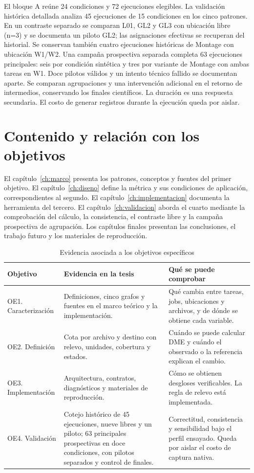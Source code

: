 El bloque A reúne 24 condiciones y 72 ejecuciones elegibles. La validación histórica detallada analiza 45 ejecuciones de 15 condiciones en los cinco patrones. En un contraste separado se comparan L01, GL2 y GL3 con ubicación libre (n=3) y se documenta un piloto GL2; las asignaciones efectivas se recuperan del historial. Se conservan también cuatro ejecuciones históricas de Montage con ubicación W1/W2. Una campaña prospectiva separada completa 63 ejecuciones principales: seis por condición sintética y tres por variante de Montage con ambas tareas en W1. Doce pilotos válidos y un intento técnico fallido se documentan aparte. Se comparan agrupaciones y una intervención adicional en el retorno de intermedios, conservando los finales científicos. La duración es una respuesta secundaria. El costo de generar registros durante la ejecución queda por aislar.

\section{Contenido y relación con los objetivos}
El capítulo~\ref{ch:marco} presenta los patrones, conceptos y fuentes del primer objetivo. El capítulo~\ref{ch:diseno} define la métrica y sus condiciones de aplicación, correspondientes al segundo. El capítulo~\ref{ch:implementacion} documenta la herramienta del tercero. El capítulo~\ref{ch:validacion} aborda el cuarto mediante la comprobación del cálculo, la consistencia, el contraste libre y la campaña prospectiva de agrupación. Los capítulos finales presentan las conclusiones, el trabajo futuro y los materiales de reproducción.

\begin{table}[htbp]\centering\small
\caption{Evidencia asociada a los objetivos específicos}
\label{tab:objetivos_evidencia}
\begin{tabularx}{\linewidth}{@{}P{2.5cm}YY@{}}
\toprule Objetivo & Evidencia en la tesis & Qué se puede comprobar\\\midrule
OE1. Caracterización & Definiciones, cinco grafos y fuentes en el marco teórico y la implementación. & Qué cambia entre tareas, jobs, ubicaciones y archivos, y de dónde se obtiene cada variable.\\
OE2. Definición & Cota por archivo y destino con relevo, unidades, cobertura y estados. & Cuándo se puede calcular DME y cuándo el observado o la referencia explican el cambio.\\
OE3. Implementación & Arquitectura, contratos, diagnósticos y materiales de reproducción. & Cómo se obtienen desgloses verificables. La regla de relevo está implementada.\\
OE4. Validación & Cotejo histórico de 45 ejecuciones, nueve libres y un piloto; 63 principales prospectivas en doce condiciones, con pilotos separados y control de finales. & Correctitud, consistencia y sensibilidad bajo el perfil ensayado. Queda por aislar el costo de captura nativa.\\
\bottomrule
\end{tabularx}
\end{table}
